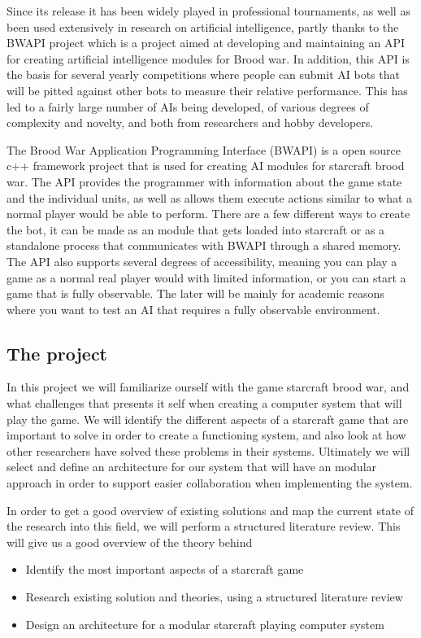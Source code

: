 Since its release it has been widely played in professional tournaments, as well as been used extensively in research on artificial intelligence, partly thanks to the BWAPI project which is a project aimed at developing and maintaining an API
for creating artificial intelligence modules for Brood war. In addition, this API is the basis for several yearly competitions where people can submit AI bots that will be pitted against other bots to measure their relative performance. This has led to a fairly large number of
AIs being developed, of various degrees of complexity and novelty, and both from researchers and hobby developers. 

The Brood War Application Programming Interface (BWAPI) is a open source c++ framework project that is used for creating AI modules for starcraft brood war. The API provides the programmer with information about the game state and the individual units, as well as allows them execute actions similar to what a normal player would be able to perform. There are a few different ways to create the bot, it can be made as an module that gets loaded into starcraft or as a standalone process that communicates with BWAPI through a shared memory. The API also supports several degrees of accessibility, meaning you can play a game as a normal real player would with limited information, or you can start a game that is fully observable. The later will be mainly for academic reasons where you want to test an AI that requires a fully observable environment.  

\subsection{The project}
In this project we will familiarize ourself with the game starcraft brood war, and what challenges that presents it self when creating a computer system that will play the game. We will identify the different aspects of a starcraft game that are important to solve in order to create a functioning system, and also look at how other researchers have solved these problems in their systems. Ultimately we will select and define an architecture for our system that will have an modular approach in order to support easier collaboration when implementing the system. 

In order to get a good overview of existing solutions and map the current state of the research into this field, we will perform a structured literature review. This will give us a good overview of the theory behind 
\begin{itemize}
\item Identify the most important aspects of a starcraft game
\item Research existing solution and theories, using a structured literature review
\item Design an architecture for a modular starcraft playing computer system
\end{itemize}

